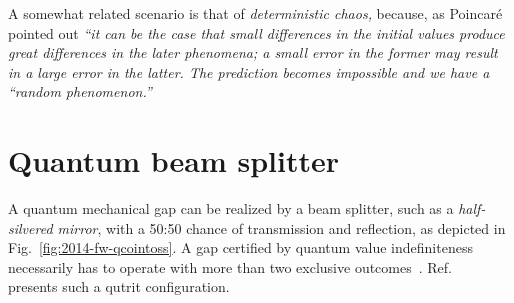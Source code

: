 \documentclass{llncs}
\begin{document}
A somewhat related scenario is that of {\em deterministic chaos,} because,
as Poincar{\'e} pointed out \cite[Chapter~4, Section~2,  p.+56--57]{poincare14}
{\em ``it can be the case that small differences in the initial values
produce great differences in the later phenomena;
a small error in the former may result in a large error in the latter.
The prediction becomes impossible and we have a ``random phenomenon.''}



\section{Quantum beam splitter}

A quantum mechanical gap can be realized by a beam splitter, such as a {\em half-silvered mirror},
with a 50:50 chance of transmission and reflection,
as depicted in Fig.~\ref{fig:2014-fw-qcointoss}.
A gap certified by quantum value indefiniteness necessarily has to operate with more than two exclusive outcomes~\cite{PhysRevA.89.032109}.
Ref.~\cite{2012-incomput-proofsCJ} presents such a qutrit configuration.
\end{document}
